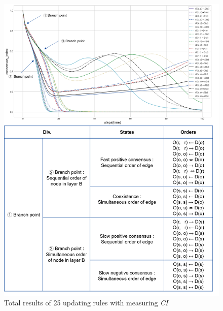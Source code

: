 \begin{figure}[!htb]
	\centering
	\includegraphics[width=\hsize]{figure/chap4_ordertotal2.png}
	\caption{Total results of 25 updating rules with measuring \textit{CI}}
	\label{ordertotal2}
\end{figure}

